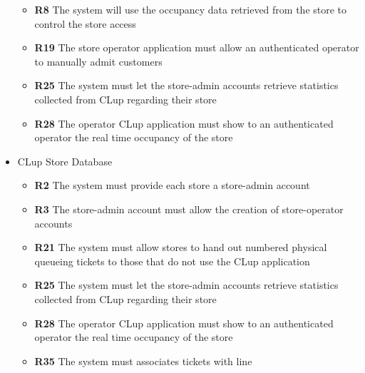 \begin{itemize}
\begin{itemize}
        \item \textbf{R8} The system will use the occupancy data retrieved from the store to control the store access
        \item \textbf{R19} The store operator application must allow an authenticated operator to manually admit customers
        \item \textbf{R25} The system must let the store-admin accounts retrieve statistics collected from CLup regarding their store
        \item \textbf{R28} The operator CLup application must show to an authenticated operator the real time occupancy of the store
    \end{itemize}
    \item CLup Store Database
    \begin{itemize}
        \item \textbf{R2} The system must provide each store a store-admin account
        \item \textbf{R3} The store-admin account must allow the creation of store-operator accounts
        \item \textbf{R21} The system must allow stores to hand out numbered physical queueing tickets to those that do not use the CLup application
        \item \textbf{R25} The system must let the store-admin accounts retrieve statistics collected from CLup regarding their store
        \item \textbf{R28} The operator CLup application must show to an authenticated operator the real time occupancy of the store
        \item \textbf{R35} The system must associates tickets with line 
    \end{itemize}
\end{itemize}
